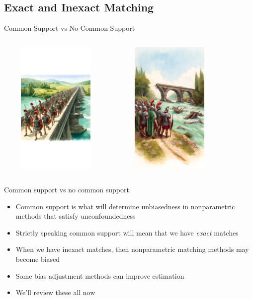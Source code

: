 \documentclass{beamer}
\begin{document}
\subsection{Exact and Inexact Matching}

\begin{frame}{Common Support vs No Common Support}
    \begin{columns}
        \centering
        \includegraphics[height=6.5cm, width=5.5cm]{./lecture_includes/romans_commonsupport.png}

        \centering
        \includegraphics[height=6.5cm, width=5.5cm]{./lecture_includes/romans_nosupport.png}
    \end{columns} 
\end{frame}

\begin{frame}{Common support vs no common support}

\begin{itemize}
\item Common support is what will determine unbiasedness in nonparametric methods that satisfy unconfoundedness
\item Strictly speaking common support will mean that we have \emph{exact} matches
\item When we have inexact matches, then nonparametric matching methods may become biased
\item Some bias adjustment methods can improve estimation
\item We'll review these all now
\end{itemize}

\end{frame}
\end{document}
